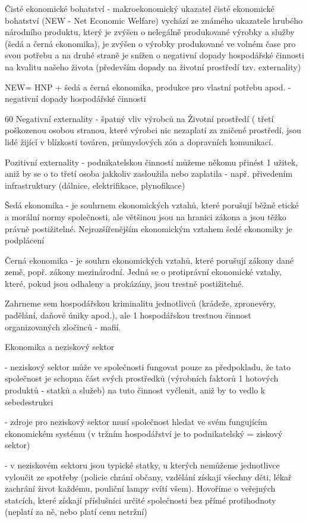 Čisté ekonomické bohatství - makroekonomický ukazatel čisté ekonomické bohatství (NEW
- Net Economic Welfare) vychází ze známého ukazatele hrubého národního produktu, který
je zvýšen o nelegálně produkované výrobky a služby (šedá a černá ekonomika), je zvýšen o
výrobky produkované ve volném čase pro svou potřebu a na druhé straně je snížen o negativní
dopady hospodářské činnosti na kvalitu našeho života (především dopady na životní prostředí
tzv. externality)

NEW= HNP + šedá a černá ekonomika, produkce pro vlastní potřebu apod. - negativní
dopady hospodářské činnosti

60
\newpage
Negativní externality - špatný vliv výrobců na Životní prostředí ( třetí poškozenou osobou
stranou, které výrobci nic nezaplatí za zničené prostředí, jsou lidé žijící v blízkosti továren,
průmyslových zón a dopravních komunikací.

Pozitivní externality - podnikatelskou činností můžeme někomu přinést 1 užitek, aniž by se o
to třetí osoba jakkoliv zasloužila nebo zaplatila - např. přivedením infrastruktury (dálnice,
elektrifikace, plynofikace)

Šedá ekonomika - je souhrnem ekonomických vztahů, které porušují běžné etické a morální
normy společnosti, ale většinou jsou na hranici zákona a jsou těžko právně postižitelné.
Nejrozšířenějším ekonomickým vztahem šedé ekonomiky je podplácení

Černá ekonomika - je souhrn ekonomických vztahů, které porušují zákony dané země, popř.
zákony mezinárodní. Jedná se o protiprávní ekonomické vztahy, které, pokud jsou odhaleny a
prokázány, jsou trestně postižitelné.

Zahrneme sem hospodářskou kriminalitu jednotlivců (krádeže, zpronevěry, padělání, daňové
úniky apod.), ale 1 hospodářskou trestnou činnost organizovaných zločinců - mafií.

Ekonomika a neziskový sektor

- neziskový sektor může ve společnosti fungovat pouze za předpokladu, že tato společnost je
schopna část svých prostředků (výrobních faktorů 1 hotových produktů - statků a služeb) na
tuto činnost vyčlenit, aniž by to vedlo k sebedestrukci

- zdroje pro neziskový sektor musí společnost hledat ve svém fungujícím ekonomickém
systému (v tržním hospodářství je to podnikatelský = ziskový sektor)

- v neziskovém sektoru jsou typické statky, u kterých nemůžeme jednotlivce vyloučit ze
spotřeby (policie chrání občany, vzdělání získají všechny děti, lékař zachrání život každému,
pouliční lampy svítí všem). Hovoříme o veřejných statcích, které získají příslušníci určité
společnosti bez přímé protihodnoty (neplatí za ně, nebo platí cenu netržní)


